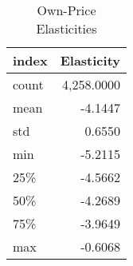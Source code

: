 \begin{table}[!htbp]
\centering
\caption{Own-Price Elasticities}
\label{tab:own_elasticities}
\begin{tabular}{lr}
\toprule
index & Elasticity \\
\midrule
count & 4,258.0000 \\
mean & -4.1447 \\
std & 0.6550 \\
min & -5.2115 \\
25\% & -4.5662 \\
50\% & -4.2689 \\
75\% & -3.9649 \\
max & -0.6068 \\
\bottomrule
\end{tabular}

\end{table}
